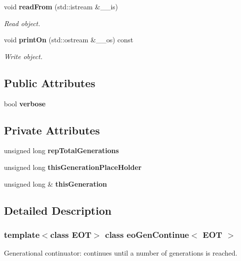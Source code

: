 \begin{CompactItemize}
\item 
void {\bf read\-From} (std::istream \&\_\-\_\-is)
\begin{CompactList}\small\item\em Read object. \item\end{CompactList}\item 
void {\bf print\-On} (std::ostream \&\_\-\_\-os) const 
\begin{CompactList}\small\item\em Write object. \item\end{CompactList}\end{CompactItemize}
\subsection*{Public Attributes}
\begin{CompactItemize}
\item 
bool {\bf verbose}\label{classeo_gen_continue_o0}

\end{CompactItemize}
\subsection*{Private Attributes}
\begin{CompactItemize}
\item 
unsigned long {\bf rep\-Total\-Generations}\label{classeo_gen_continue_r0}

\item 
unsigned long {\bf this\-Generation\-Place\-Holder}\label{classeo_gen_continue_r1}

\item 
unsigned long \& {\bf this\-Generation}\label{classeo_gen_continue_r2}

\end{CompactItemize}


\subsection{Detailed Description}
\subsubsection*{template$<$class EOT$>$ class eo\-Gen\-Continue$<$ EOT $>$}

Generational continuator: continues until a number of generations is reached. 



